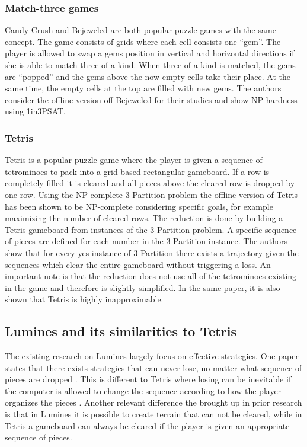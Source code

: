 \subsubsection{Match-three games}

Candy Crush and Bejeweled are both popular puzzle games with the same concept. The game consists of grids where each cell consists one ``gem''. The player is allowed to swap a gems position in vertical and horizontal directions if she is able to match three of a kind. When three of a kind is matched, the gems are ``popped'' and the gems above the now empty cells take their place. At the same time, the empty cells at the top are filled with new gems. The authors consider the offline version off Bejeweled for their studies and show NP-hardness using 1in3PSAT. \cite{candy}

\subsubsection{Tetris}

Tetris is a popular puzzle game where the player is given a sequence of tetrominoes to pack into a grid-based rectangular gameboard. If a row is completely filled it is cleared and all pieces above the cleared row is dropped by one row. Using the NP-complete 3-Partition problem the offline version of Tetris has been shown to be NP-complete considering specific goals, for example maximizing the number of cleared rows. The reduction is done by building a Tetris gameboard from instances of the 3-Partition problem. A specific sequence of pieces are defined for each number in the 3-Partition instance. The authors show that for every yes-instance of 3-Partition there exists a trajectory given the sequences which clear the entire gameboard without triggering a loss. An important note is that the reduction does not use all of the tetrominoes existing in the game and therefore is slightly simplified. In the same paper, it is also shown that Tetris is highly inapproximable. 

\subsection{Lumines and its similarities to Tetris}
\label{subsub:sim}

The existing research on Lumines largely focus on effective strategies. One paper states that there exists strategies that can never lose, no matter what sequence of pieces are dropped \cite{lumines}. This is different to Tetris where losing can be inevitable if the computer is allowed to change the sequence according to how the player organizes the pieces \cite[p. 4]{tetris}. Another relevant difference the brought up in prior research is that in Lumines it is possible to create terrain that can not be cleared, while in Tetris a gameboard can always be cleared if the player is given an appropriate sequence of pieces.

